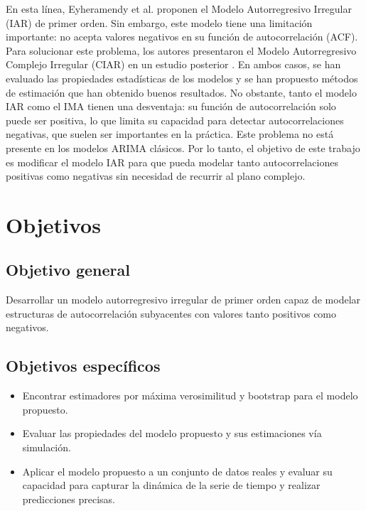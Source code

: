  

En esta línea, Eyheramendy et al. \cite{eyheramendy2018irregular} proponen el Modelo 
Autorregresivo Irregular (IAR) de primer orden. Sin embargo, este modelo tiene una limitación 
importante: no acepta valores negativos en su función de autocorrelación (ACF). Para solucionar 
este problema, los autores presentaron el Modelo Autorregresivo Complejo Irregular (CIAR) en un 
estudio posterior \citep{elorrieta2019discrete}. En ambos casos, se han evaluado las propiedades 
estadísticas de los modelos y se han propuesto métodos de estimación que han obtenido buenos 
resultados. No obstante, tanto el modelo IAR como el IMA tienen una desventaja: su función de 
autocorrelación solo puede ser positiva, lo que limita su capacidad para detectar 
autocorrelaciones negativas, que suelen ser importantes en la práctica. Este problema no está 
presente en los modelos ARIMA clásicos. Por lo tanto, el objetivo de este trabajo es 
modificar el modelo IAR para que pueda modelar tanto autocorrelaciones positivas como negativas 
sin necesidad de recurrir al plano complejo.
 
\section{Objetivos}
\subsection{Objetivo general}
Desarrollar un modelo autorregresivo irregular de primer orden capaz de 
modelar estructuras de autocorrelación subyacentes con valores tanto positivos como negativos.
\subsection{Objetivos específicos}
\begin{itemize}
    \item Encontrar estimadores por máxima verosimilitud y bootstrap para el modelo propuesto.
    \item Evaluar las propiedades del modelo propuesto y sus estimaciones vía simulación.
    \item Aplicar el modelo propuesto a un conjunto de datos reales y evaluar su capacidad para capturar la dinámica 
          de la serie de tiempo y realizar predicciones precisas.
\end{itemize}